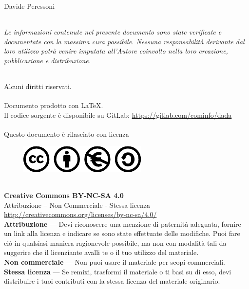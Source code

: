  Davide Peressoni\\~\par
    \emph{Le informazioni contenute nel presente documento sono state verificate e documentate con la massima cura possibile. Nessuna responsabilità derivante dal loro utilizzo potrà venire imputata all’Autore coinvolto nella loro creazione, pubblicazione e distribuzione.}\\~\par
    Alcuni diritti riservati.\\~\\
    Documento prodotto con \LaTeX.\\
    Il codice sorgente è disponibile su GitLab: \url{https://gitlab.com/cominfo/dada}\\~\\
    Questo documento è rilasciato con licenza\\
    \begin{figure}[!ht]
	\centering
	    \includegraphics{CC.pdf}
    \end{figure}~\\
    \textbf{Creative Commons BY-NC-SA 4.0}\\
    Attribuzione – Non Commerciale - Stessa licenza\\
    \url{http://creativecommons.org/licenses/by-nc-sa/4.0/}\\
    \textbf{Attribuzione} — Devi riconoscere una menzione di paternità adeguata, fornire un link alla licenza e indicare se sono state effettuate delle modifiche. Puoi
    fare ciò in qualsiasi maniera ragionevole possibile, ma non con modalità tali da suggerire che il licenziante avalli te o il tuo utilizzo del materiale.\\
    \textbf{Non commerciale} — Non puoi usare il materiale per scopi commerciali.\\
    \textbf{Stessa licenza} — Se remixi, trasformi il materiale o ti basi su di esso, devi distribuire i tuoi contributi con la stessa licenza del materiale originario.
